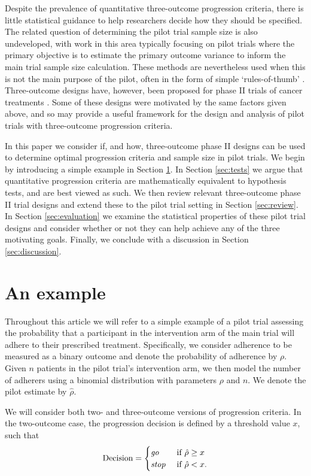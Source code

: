 \documentclass{bmcart}
\begin{document}
Despite the prevalence of quantitative three-outcome progression criteria\cite{Herbert2019}, there is little statistical guidance to help researchers decide how they should be specified. The related question of determining the pilot trial sample size is also undeveloped, with work in this area typically focusing on pilot trials where the primary objective is to estimate the primary outcome variance to inform the main trial sample size calculation. These methods are nevertheless used when this is not the main purpose of the pilot, often in the form of simple `rules-of-thumb' \cite{Browne1995, Teare2014, Whitehead2015}. Three-outcome designs have, however, been proposed for phase II trials of cancer treatments \cite{Kirby2016}. Some of these designs were motivated by the same factors given above, and so may provide a useful framework for the design and analysis of pilot trials with three-outcome progression criteria.

In this paper we consider if, and how, three-outcome phase II designs can be used to determine optimal progression criteria and sample size in pilot trials. We begin by introducing a simple example in Section \ref{sec:example}. In Section \ref{sec:tests} we argue that quantitative progression criteria are mathematically equivalent to hypothesis tests, and are best viewed as such. We then review relevant three-outcome phase II trial designs and extend these to the pilot trial setting in Section \ref{sec:review}. In Section \ref{sec:evaluation} we examine the statistical properties of these pilot trial designs and consider whether or not they can help achieve any of the three motivating goals. Finally, we conclude with a discussion in Section \ref{sec:discussion}.

\section{An example}\label{sec:example}

Throughout this article we will refer to a simple example of a pilot trial assessing the probability that a participant in the intervention arm of the main trial will adhere to their prescribed treatment. Specifically, we consider adherence to be measured as a binary outcome and denote the probability of adherence by $\rho$. Given  $n$ patients in the pilot trial's intervention arm, we then model the number of adherers using a binomial distribution with parameters $\rho$ and $n$. We denote the pilot estimate by $\hat{\rho}$.

We will consider both two- and three-outcome versions of progression criteria. In the two-outcome case, the progression decision is defined by a threshold value $x$, such that
\begin{equation}\label{eqn:two_outcome}
\text{Decision} = 
\begin{cases}
\text{\emph{go}} & \text{ if } \hat{\rho} \geq x \\
\text{\emph{stop}} & \text{ if } \hat{\rho} < x. \\
\end{cases}
\end{equation}
\end{document}
